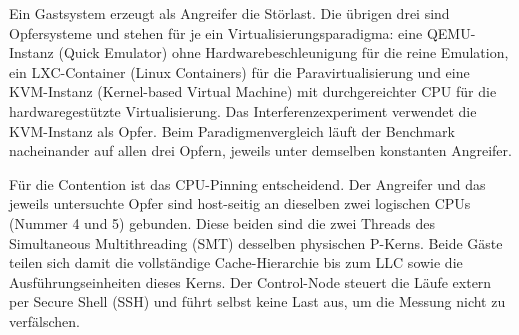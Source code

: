 \documentclass[conference]{IEEEtran}
\begin{document}
Ein Gastsystem erzeugt als Angreifer die Störlast. Die übrigen drei sind Opfersysteme und stehen für je ein Virtualisierungsparadigma: eine QEMU-Instanz (Quick Emulator) ohne Hardwarebeschleunigung für die reine Emulation, ein LXC-Container (Linux Containers) für die Paravirtualisierung und eine KVM-Instanz (Kernel-based Virtual Machine) mit durchgereichter CPU für die hardwaregestützte Virtualisierung. Das Interferenzexperiment verwendet die KVM-Instanz als Opfer. Beim Paradigmenvergleich läuft der Benchmark nacheinander auf allen drei Opfern, jeweils unter demselben konstanten Angreifer.

Für die Contention ist das CPU-Pinning entscheidend. Der Angreifer und das jeweils untersuchte Opfer sind host-seitig an dieselben zwei logischen CPUs (Nummer 4 und 5) gebunden. Diese beiden sind die zwei Threads des Simultaneous Multithreading (SMT) desselben physischen P-Kerns. Beide Gäste teilen sich damit die vollständige Cache-Hierarchie bis zum LLC sowie die Ausführungseinheiten dieses Kerns. Der Control-Node steuert die Läufe extern per Secure Shell (SSH) und führt selbst keine Last aus, um die Messung nicht zu verfälschen.
\end{document}
